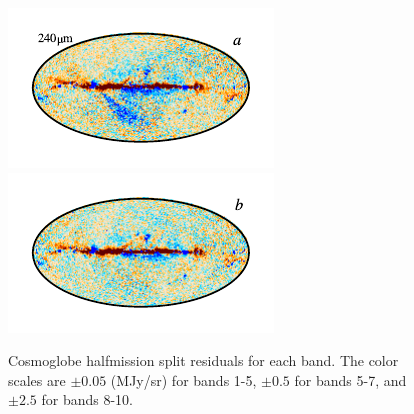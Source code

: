 \documentclass{aa}
\begin{document}
\begin{figure}
	\includegraphics{figs/res_maps/res_10a_c0001_000019.pdf}\includegraphics{figs/res_maps/res_10b_c0001_000019.pdf}
  \vspace*{-0.85cm}


	\caption{Cosmoglobe halfmission split residuals for each band. The color scales are $\pm 0.05$ (MJy/sr) for bands 1-5, $\pm 0.5$ for bands 5-7, and $\pm 2.5$ for bands 8-10.}
	\label{fig:res}
\end{figure}
\end{document}
